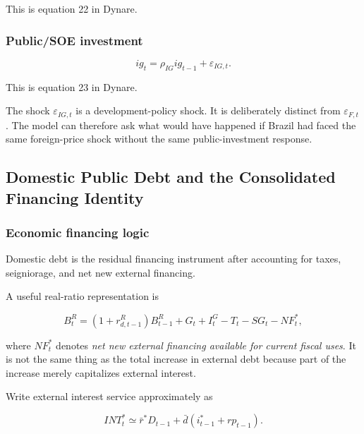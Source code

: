 This is equation 22 in Dynare.

\subsubsection{Public/SOE investment}

\begin{equation}
\boxed{
ig_t
=
\rho_{IG}ig_{t-1}
+
\varepsilon_{IG,t}.
}
\label{eq:ig_final}
\end{equation}

This is equation 23 in Dynare.

The shock \(\varepsilon_{IG,t}\) is a development-policy shock. It is
deliberately distinct from \(\varepsilon_{F,t}\). The model can therefore ask
what would have happened if Brazil had faced the same foreign-price shock
without the same public-investment response.

\subsection{Domestic Public Debt and the Consolidated Financing Identity}
\label{app:domesticdebt}

\subsubsection{Economic financing logic}

Domestic debt is the residual financing instrument after accounting for taxes,
seigniorage, and net new external financing.

A useful real-ratio representation is

\begin{equation}
B_t^R
=
(1+r_{d,t-1}^R)B_{t-1}^R
+
G_t
+
I_t^G
-
T_t
-
SG_t
-
NF_t^{*},
\label{eq:domestic_debt_motivation}
\end{equation}

where \(NF_t^{*}\) denotes \emph{net new external financing available for
current fiscal uses}. It is not the same thing as the total increase in
external debt because part of the increase merely capitalizes external
interest.

Write external interest service approximately as

\begin{equation}
INT_t^{*}
\simeq
\bar r^{*}D_{t-1}
+
\bar d
\left(
i_{t-1}^{*}+rp_{t-1}
\right).
\label{eq:external_interest_linear}
\end{equation}

